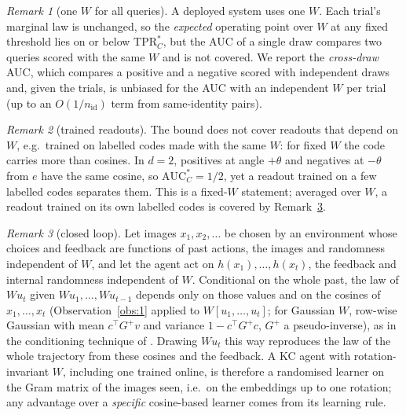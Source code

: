 \documentclass[preprint,12pt,authoryear]{elsarticle}
\theoremstyle{remark}
\newtheorem{remark}{Remark}
\begin{document}
\begin{remark}[one $W$ for all queries]\label{rem:onew}
A deployed system uses one $W$. Each trial's marginal law is unchanged, so the \emph{expected} operating point
over $W$ at any fixed threshold lies on or below $\mathrm{TPR}^*_C$, but the AUC of a single draw compares two
queries scored with the same $W$ and is not covered. We report the \emph{cross-draw} AUC, which compares a positive
and a negative scored with independent draws and, given the trials, is unbiased for the AUC with an independent
$W$ per trial (up to an $O(1/n_{\mathrm{id}})$ term from same-identity pairs).
\end{remark}

\begin{remark}[trained readouts]\label{rem:trained}
The bound does not cover readouts that depend on $W$, e.g.\ trained on labelled codes made with the same $W$:
for fixed $W$ the code carries more than cosines. In $d=2$, positives at angle $+\theta$ and negatives at
$-\theta$ from $e$ have the same cosine, so $\mathrm{AUC}^*_C=1/2$, yet a readout trained on a few labelled codes
separates them. This is a fixed-$W$ statement; averaged over $W$, a readout trained on its own labelled codes is
covered by Remark~\ref{rem:loop}.
\end{remark}

\begin{remark}[closed loop]\label{rem:loop}
Let images $x_1,x_2,\dots$ be chosen by an environment whose choices and feedback are functions of past actions,
the images and randomness independent of $W$, and let the agent act on $h(x_1),\dots,h(x_t)$, the feedback and
internal randomness independent of $W$. Conditional on the whole past, the law of $Wu_t$ given
$Wu_1,\dots,Wu_{t-1}$ depends only on those values and on the cosines of $x_1,\dots,x_t$ (Observation~\ref{obs:1}
applied to $W[u_1,\dots,u_t]$; for Gaussian $W$, row-wise Gaussian with mean $c^\top G^{+}v$ and variance
$1-c^\top G^{+}c$, $G^{+}$ a pseudo-inverse), as in the conditioning technique of \citet{bayati2011}. Drawing
$Wu_t$ this way reproduces the law of the whole trajectory from these cosines and the feedback. A KC agent with
rotation-invariant $W$, including one trained online, is therefore a randomised learner on the Gram matrix of
the images seen, i.e.\ on the embeddings up to one rotation; any advantage over a \emph{specific} cosine-based
learner comes from its learning rule.
\end{remark}
\end{document}
